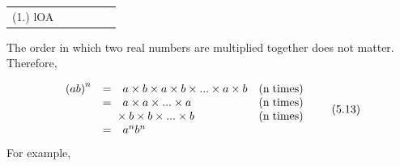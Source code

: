  \par \begin{tabular}[h]{cccccc}
 (1.) lOA  & \end{tabular}
            \nopagebreak
        \label{m38359*id65819}The order in which two real numbers are multiplied together does not matter. Therefore,\par 
        \label{m38359*uid30}\nopagebreak\noindent{}
    \begin{equation}
    \begin{array}{cccc}\hfill {\left(ab\right)}^{n}& =& a\ensuremath{\times}b\ensuremath{\times}a\ensuremath{\times}b\ensuremath{\times}...\ensuremath{\times}a\ensuremath{\times}b\hfill & \left(\mathrm{n\; times}\right)\hfill \\ \hfill & =& a\ensuremath{\times}a\ensuremath{\times}...\ensuremath{\times}a\hfill & \left(\mathrm{n\; times}\right)\hfill \\ \hfill & & \phantom{\rule{-0.166667em}{0ex}}\phantom{\rule{-0.166667em}{0ex}}\phantom{\rule{-0.166667em}{0ex}}\phantom{\rule{-0.166667em}{0ex}}\ensuremath{\times}b\ensuremath{\times}b\ensuremath{\times}...\ensuremath{\times}b\hfill & \left(\mathrm{n\; times}\right)\hfill \\ \hfill & =& {a}^{n}{b}^{n}\hfill & \end{array}\tag{5.13}
      \end{equation}
        \label{m38359*id66030}For example,\par 
        \label{m38359*id66034}\nopagebreak\noindent{}
          
